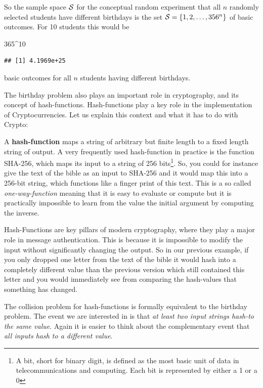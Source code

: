 \documentclass[
]{book}
\newenvironment{Shaded}{\begin{snugshade}}{\end{snugshade}}
\newcommand{\DecValTok}[1]{\textcolor[rgb]{0.00,0.00,0.81}{#1}}
\newcommand{\SpecialCharTok}[1]{\textcolor[rgb]{0.00,0.00,0.00}{#1}}
\begin{document}
So the sample space \({\cal S}\) for the conceptual
random experiment that all \(n\) randomly selected students have different birthdays
is the set \({\cal S} =\{1,2,\ldots, 356^n\}\) of basic outcomes. For 10 students this would
be

\begin{Shaded}
\begin{Highlighting}[]
\DecValTok{365}\SpecialCharTok{\^{}}\DecValTok{10}
\end{Highlighting}
\end{Shaded}

\begin{verbatim}
## [1] 4.1969e+25
\end{verbatim}

basic outcomes for all \(n\) students having different birthdays.

The birthday problem also plays an important role in cryptography, and its
concept of hash-functions.
Hash-functions play a key role in the implementation of Cryptocurrencies. Let us explain this
context and what it has to do with Crypto:

A \textbf{hash-function} maps a string of arbitrary but finite length to a fixed length string
of output. A
very frequently used hash-function in practice is the function SHA-256, which maps its input
to a string of 256 bits\footnote{A bit, short for binary digit, is defined as the most basic
  unit of data in telecommunications and computing. Each bit is represented
  by either a 1 or a 0}. So, you could for instance give the text of the bible as an
input to SHA-256 and it would map this into a 256-bit string, which functions like
a finger print of this text. This is a so
called \emph{one-way-function} meaning that it is easy to evaluate or compute but it is
practically impossible to learn from the value the initial argument by computing the inverse.

Hash-Functions are key pillars of modern cryptography, where they play a major role in message
authentication. This is because it is impossible to modify the input without significantly
changing the output. So in our previous example, if you only dropped one letter from the text
of the bible it would hash into a completely different value than the previous version which
still contained this letter and you would immediately see from
comparing the hash-values that something has changed.

The collision problem for hash-functions is formally equivalent to the birthday problem. The event
we are interested in is that \emph{at least two input strings hash-to the same value}. Again it
is easier to think about the complementary event that \emph{all inputs hash to a different value}.
\end{document}
